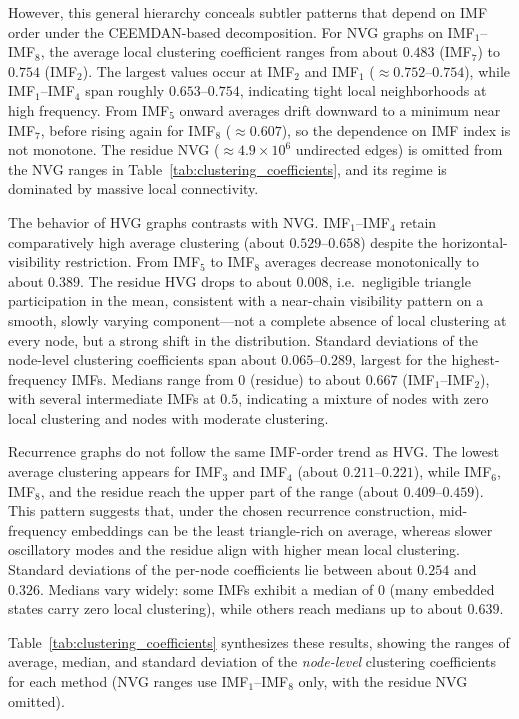 \documentclass[11pt,a4paper]{article}
\begin{document}
However, this general hierarchy conceals subtler patterns that depend on IMF order under the CEEMDAN-based decomposition. For NVG graphs on IMF$_1$--IMF$_8$, the average local clustering coefficient ranges from about $0.483$ (IMF$_7$) to $0.754$ (IMF$_2$). The largest values occur at IMF$_2$ and IMF$_1$ ($\approx 0.752$--$0.754$), while IMF$_1$--IMF$_4$ span roughly $0.653$--$0.754$, indicating tight local neighborhoods at high frequency. From IMF$_5$ onward averages drift downward to a minimum near IMF$_7$, before rising again for IMF$_8$ ($\approx 0.607$), so the dependence on IMF index is not monotone. The residue NVG ($\approx 4.9 \times 10^6$ undirected edges) is omitted from the NVG ranges in Table~\ref{tab:clustering_coefficients}, and its regime is dominated by massive local connectivity.

The behavior of HVG graphs contrasts with NVG. IMF$_1$--IMF$_4$ retain comparatively high average clustering (about $0.529$--$0.658$) despite the horizontal-visibility restriction. From IMF$_5$ to IMF$_8$ averages decrease monotonically to about $0.389$. The residue HVG drops to about $0.008$, i.e.\ negligible triangle participation in the mean, consistent with a near-chain visibility pattern on a smooth, slowly varying component---not a complete absence of local clustering at every node, but a strong shift in the distribution. Standard deviations of the node-level clustering coefficients span about $0.065$--$0.289$, largest for the highest-frequency IMFs. Medians range from $0$ (residue) to about $0.667$ (IMF$_1$--IMF$_2$), with several intermediate IMFs at $0.5$, indicating a mixture of nodes with zero local clustering and nodes with moderate clustering.

Recurrence graphs do not follow the same IMF-order trend as HVG. The lowest average clustering appears for IMF$_3$ and IMF$_4$ (about $0.211$--$0.221$), while IMF$_6$, IMF$_8$, and the residue reach the upper part of the range (about $0.409$--$0.459$). This pattern suggests that, under the chosen recurrence construction, mid-frequency embeddings can be the least triangle-rich on average, whereas slower oscillatory modes and the residue align with higher mean local clustering. Standard deviations of the per-node coefficients lie between about $0.254$ and $0.326$. Medians vary widely: some IMFs exhibit a median of $0$ (many embedded states carry zero local clustering), while others reach medians up to about $0.639$.

Table~\ref{tab:clustering_coefficients} synthesizes these results, showing the ranges of average, median, and standard deviation of the \emph{node-level} clustering coefficients for each method (NVG ranges use IMF$_1$--IMF$_8$ only, with the residue NVG omitted).
\end{document}
